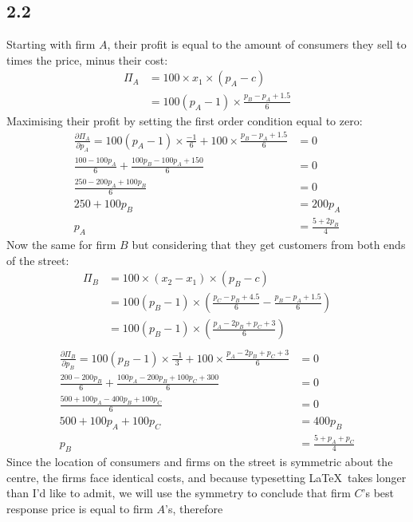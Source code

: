 \documentclass{article}
\begin{document}
\subsection*{2.2}
Starting with firm $A$, their profit is equal to the amount of consumers they sell to times the price, minus their cost:
\begin{align*}
    \Pi_{A} &= 100 \times x_{1} \times (p_{A} - c)\\
    &= 100(p_{A} - 1) \times \frac{p_{B} - p_{A} + 1.5}{6}
\end{align*}
Maximising their profit by setting the first order condition equal to zero:
\begin{align*}
    \frac{\partial \Pi_{A}}{\partial p_{A}} = 100(p_{A} - 1) \times \frac{-1}{6} + 100 \times \frac{p_{B} - p_{A} + 1.5}{6} &= 0\\
    \frac{100 - 100p_{A}}{6} + \frac{100p_{B} - 100p_{A} + 150}{6} &= 0\\
    \frac{250 - 200p_{A} + 100p_{B}}{6} &= 0\\
    250 + 100p_{B} &= 200p_{A}\\
    p_{A} &= \frac{5 + 2p_{B}}{4}
\end{align*}
Now the same for firm $B$ but considering that they get customers from both ends of the street:
\begin{align*}
    \Pi_{B}&= 100 \times (x_{2} - x_{1}) \times (p_{B} - c)                                                      \\
           &= 100(p_{B} - 1) \times \left( \frac{p_{C} - p_{B} + 4.5}{6} - \frac{p_{B} - p_{A} + 1.5}{6} \right) \\
           &= 100(p_{B} - 1) \times \left( \frac{p_{A} - 2p_{B} + p_{C} + 3}{6} \right)                          \\
\end{align*}
\begin{align*}
    \frac{\partial \Pi_{B}}{\partial p_{B}} = 100(p_{B} - 1) \times \frac{-1}{3} + 100 \times \frac{p_{A} - 2p_{B} + p_{C} + 3}{6} & = 0\\
    \frac{200 - 200p_{B}}{6} + \frac{100p_{A} - 200p_{B} + 100p_{C} + 300}{6} & = 0\\
    \frac{500 + 100p_{A} - 400p_{B} + 100p_{C}}{6} & = 0\\
    500 + 100p_{A} + 100p_{C} &= 400p_{B}\\
    p_{B} &= \frac{5 + p_{A} + p_{C}}{4}
\end{align*}
Since the location of consumers and firms on the street is symmetric about the centre, the firms face identical costs, and because typesetting \LaTeX\ takes longer than I'd like to admit, we will use the symmetry to conclude that firm $C$'s best response price is equal to firm $A$'s, therefore
\end{document}

